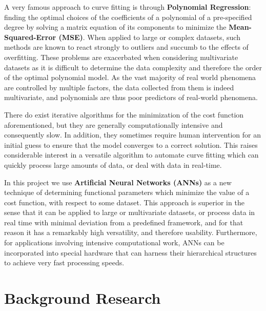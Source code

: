 \documentclass{article}
\begin{document}
A very famous approach to curve fitting is through \textbf{Polynomial Regression}: finding the optimal choices of the coefficients of a polynomial of a pre-specified degree by solving a matrix equation of its components to minimize the \textbf{Mean-Squared-Error (MSE)}. When applied to large or complex datasets, such methods are known to react strongly to outliers and succumb to the effects of overfitting. These problems are exacerbated when considering multivariate datasets as it is difficult to determine the data complexity and therefore the order of the optimal polynomial model. As the vast majority of real world phenomena are controlled by multiple factors, the data collected from them is indeed multivariate, and polynomials are thus poor predictors of real-world phenomena.

There do exist iterative algorithms for the minimization of the cost function aforementioned, but they are generally computationally intensive and consequently slow. In addition, they sometimes require human intervention for an initial guess to ensure that the model converges to a correct solution. This raises considerable interest in a versatile algorithm to automate curve fitting which can quickly process large amounts of data, or deal with data in real-time.

In this project we use \textbf{Artificial Neural Networks (ANNs)} as a new technique of determining functional parameters which minimize the value of a cost function, with respect to some dataset. This approach is superior in the sense that it can be applied to large or multivariate datasets, or process data in real time with minimal deviation from a predefined framework, and for that reason it has a remarkably high versatility, and therefore usability. Furthermore, for applications involving intensive computational work, ANNs can be incorporated into special hardware that can harness their hierarchical structures to
achieve very fast processing speeds.



\section{Background Research}
\end{document}
